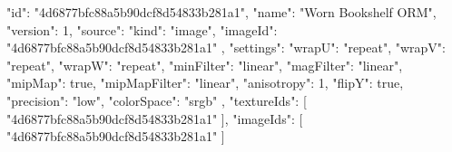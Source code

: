 {
  "id": "4d6877bfc88a5b90dcf8d54833b281a1",
  "name": "Worn Bookshelf ORM",
  "version": 1,
  "source": {
    "kind": "image",
    "imageId": "4d6877bfc88a5b90dcf8d54833b281a1"
  },
  "settings": {
    "wrapU": "repeat",
    "wrapV": "repeat",
    "wrapW": "repeat",
    "minFilter": "linear",
    "magFilter": "linear",
    "mipMap": true,
    "mipMapFilter": "linear",
    "anisotropy": 1,
    "flipY": true,
    "precision": "low",
    "colorSpace": "srgb"
  },
  "textureIds": [
    "4d6877bfc88a5b90dcf8d54833b281a1"
  ],
  "imageIds": [
    "4d6877bfc88a5b90dcf8d54833b281a1"
  ]
}
